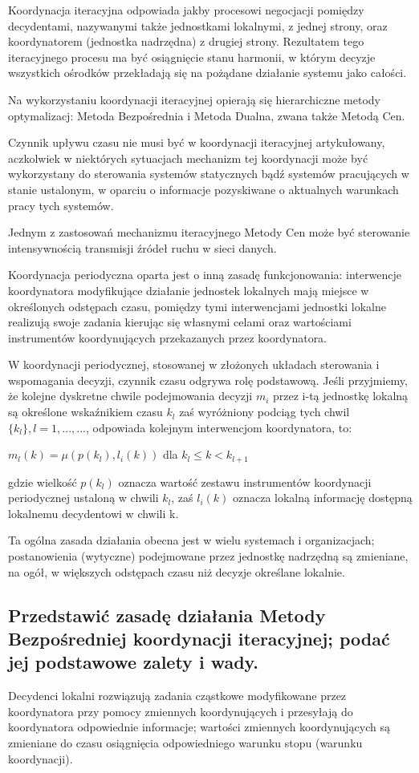 Koordynacja iteracyjna odpowiada jakby procesowi negocjacji pomiędzy decydentami, nazywanymi także jednostkami lokalnymi, z jednej strony, oraz koordynatorem (jednostka nadrzędna) z drugiej strony. Rezultatem tego iteracyjnego procesu ma być osiągnięcie stanu harmonii, w którym decyzje wszystkich ośrodków przekładają się na pożądane działanie systemu jako całości.

Na wykorzystaniu koordynacji iteracyjnej opierają się hierarchiczne metody optymalizacj: Metoda Bezpośrednia i Metoda Dualna, zwana także Metodą Cen.

Czynnik upływu czasu nie musi być w koordynacji iteracyjnej artykułowany, aczkolwiek w niektórych sytuacjach mechanizm tej koordynacji może być wykorzystany do sterowania systemów statycznych bądź systemów pracujących w stanie ustalonym, w oparciu o informacje pozyskiwane o aktualnych warunkach pracy tych systemów.

Jednym z zastosowań mechanizmu iteracyjnego Metody Cen może być sterowanie intensywnością transmisji źródeł ruchu w sieci danych.

Koordynacja periodyczna oparta jest o inną zasadę funkcjonowania: interwencje koordynatora modyfikujące działanie jednostek lokalnych mają miejsce w określonych odstępach czasu, pomiędzy tymi interwencjami jednostki lokalne realizują swoje zadania kierując się własnymi celami oraz wartościami instrumentów koordynujących przekazanych przez koordynatora.

W koordynacji periodycznej, stosowanej w złożonych układach sterowania i wspomagania decyzji, czynnik czasu odgrywa rolę podstawową. Jeśli przyjmiemy, że kolejne dyskretne chwile podejmowania decyzji $m_i$ przez i-tą jednostkę lokalną są określone wskaźnikiem czasu $k_l$ zaś wyróżniony podciąg tych chwil $\{k_l\}, l=1,...,...$, odpowiada kolejnym interwencjom koordynatora, to:

$m_l(k) = \mu (p(k_l),l_i(k))$ dla $k_l \leq k < k_{l+1}$

gdzie wielkość $p(k_l)$ oznacza wartość zestawu instrumentów koordynacji periodycznej ustaloną w chwili $k_l$, zaś $l_i(k)$ oznacza lokalną informację dostępną lokalnemu decydentowi w chwili k.

Ta ogólna zasada działania obecna jest w wielu systemach i organizacjach; postanowienia (wytyczne) podejmowane przez jednostkę nadrzędną są zmieniane, na ogół, w większych odstępach czasu niż decyzje określane lokalnie.

\subsection{Przedstawić zasadę działania Metody Bezpośredniej koordynacji iteracyjnej; podać jej podstawowe zalety i wady.}
\label{pyt:37}
Decydenci lokalni rozwiązują zadania cząstkowe modyfikowane przez koordynatora przy pomocy zmiennych koordynujących i przesyłają do koordynatora odpowiednie informacje; wartości zmiennych koordynujących są zmieniane do czasu osiągnięcia odpowiedniego warunku stopu (warunku koordynacji).

